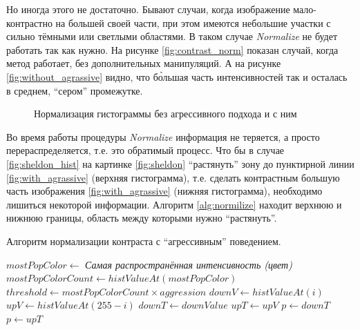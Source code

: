 \documentclass[12pt]{report}
\begin{document}
Но иногда этого не достаточно. Бывают случаи, когда изображение мало-контрастно на большей своей части, при этом 
имеются небольшие участки с сильно тёмными или светлыми областями. В таком случае \textit{Normalize} не будет 
работать так как нужно. На рисунке \ref{fig:contrast_norm} показан случай, когда метод работает, без дополнительных 
манипуляций. А на рисунке \ref{fig:without_agrassive} видно, что б\`{о}льшая часть интенсивностей так и осталась в 
среднем, ``сером'' промежутке.

\begin{figure}[h]
	\centering
	\caption{Нормализация гистограммы без агрессивного подхода  и с ним }
	\label{fig:aggresive_normal}
\end{figure}

Во время работы процедуры \textit{Normalize} информация не теряется, а просто перераспределяется, т.е. это 
обратимый 
процесс. Что бы в случае \ref{fig:sheldon_hist} на картинке \ref{fig:sheldon} ``растянуть'' зону до пунктирной 
линии 
\ref{fig:with_agrassive} (верхняя гистограмма), т.е. сделать контрастным 
большую часть изображения \ref{fig:with_agrassive} (нижняя гистограмма), необходимо лишиться некоторой информации. 
Алгоритм \ref{alg:normilize} находит верхнюю и нижнюю границы, область между которыми нужно ``растянуть''.

\begin{algorithm}
\caption{Алгоритм нормализации контраста с ``агрессивным'' поведением.}
\label{alg:normilize}

\begin{algorithmic}[1]
\STATE $mostPopColor\gets $ \emph{Самая распространённая интенсивность (цвет)}
\STATE $mostPopColorCount\gets histValueAt(mostPopColor)$ 
\STATE $threshold\gets mostPopColorCount\times{aggression}$
\STATE $downV\gets histValueAt(i)$
\STATE $upV\gets histValueAt(255-i)$
\STATE $downT\gets downValue$
\ENDIF
{}
\STATE $upT\gets upV$
\ENDIF
\ENDFOR
{} 
\STATE $p\gets downT$
\STATE $p\gets upT$	
\ENDIF
\ENDFOR
\end{algorithmic}

\end{algorithm}
\end{document}

